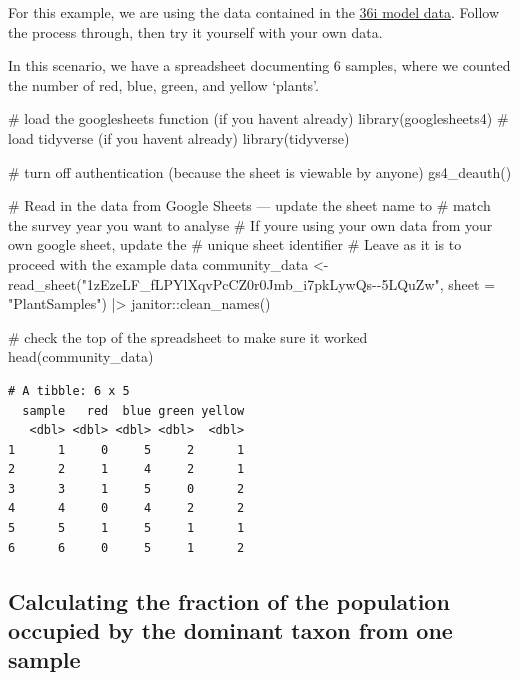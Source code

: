 \documentclass[
  letterpaper,
  DIV=11,
  numbers=noendperiod]{scrreprt}
\newenvironment{Shaded}{\begin{snugshade}}{\end{snugshade}}
\newcommand{\AttributeTok}[1]{\textcolor[rgb]{0.40,0.45,0.13}{#1}}
\newcommand{\CommentTok}[1]{\textcolor[rgb]{0.37,0.37,0.37}{#1}}
\newcommand{\FunctionTok}[1]{\textcolor[rgb]{0.28,0.35,0.67}{#1}}
\newcommand{\NormalTok}[1]{\textcolor[rgb]{0.00,0.23,0.31}{#1}}
\newcommand{\OtherTok}[1]{\textcolor[rgb]{0.00,0.23,0.31}{#1}}
\newcommand{\SpecialCharTok}[1]{\textcolor[rgb]{0.37,0.37,0.37}{#1}}
\newcommand{\StringTok}[1]{\textcolor[rgb]{0.13,0.47,0.30}{#1}}
\begin{document}
For this example, we are using the data contained in the
\href{https://docs.google.com/spreadsheets/d/1zEzeLF_fLPYlXqvPcCZ0r0Jmb_i7pkLywQs--5LQuZw/edit?gid=0\#gid=0}{36i
model data}. Follow the process through, then try it yourself with your
own data.

In this scenario, we have a spreadsheet documenting 6 samples, where we
counted the number of red, blue, green, and yellow `plants'.

\begin{Shaded}
\begin{Highlighting}[]
\CommentTok{\# load the googlesheets function (if you haven\textquotesingle{}t already)}
\FunctionTok{library}\NormalTok{(googlesheets4)}
\CommentTok{\# load tidyverse (if you haven\textquotesingle{}t already)}
\FunctionTok{library}\NormalTok{(tidyverse)}

\CommentTok{\# turn off authentication (because the sheet is viewable by anyone)}
\FunctionTok{gs4\_deauth}\NormalTok{() }

\CommentTok{\# Read in the data from Google Sheets — update the sheet name to}
\CommentTok{\# match the survey year you want to analyse}
\CommentTok{\# If you\textquotesingle{}re using your own data from your own google sheet, update the }
\CommentTok{\# unique sheet identifier}
\CommentTok{\# Leave as it is to proceed with the example data}
\NormalTok{community\_data }\OtherTok{\textless{}{-}} \FunctionTok{read\_sheet}\NormalTok{(}\StringTok{"1zEzeLF\_fLPYlXqvPcCZ0r0Jmb\_i7pkLywQs{-}{-}5LQuZw"}\NormalTok{,}
                             \AttributeTok{sheet =} \StringTok{"PlantSamples"}\NormalTok{) }\SpecialCharTok{|\textgreater{}}
\NormalTok{  janitor}\SpecialCharTok{::}\FunctionTok{clean\_names}\NormalTok{()}

 \CommentTok{\# check the top of the spreadsheet to make sure it worked}
\FunctionTok{head}\NormalTok{(community\_data)}
\end{Highlighting}
\end{Shaded}

\begin{verbatim}
# A tibble: 6 x 5
  sample   red  blue green yellow
   <dbl> <dbl> <dbl> <dbl>  <dbl>
1      1     0     5     2      1
2      2     1     4     2      1
3      3     1     5     0      2
4      4     0     4     2      2
5      5     1     5     1      1
6      6     0     5     1      2
\end{verbatim}

\subsection{Calculating the fraction of the population occupied by the
dominant taxon from one
sample}\label{calculating-the-fraction-of-the-population-occupied-by-the-dominant-taxon-from-one-sample}
\end{document}
